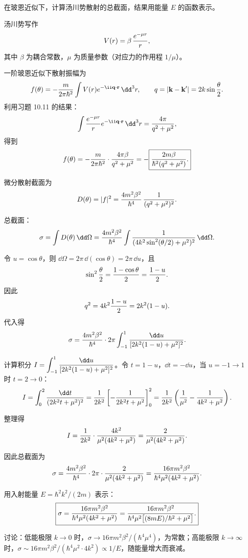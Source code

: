 \begin{question}
在玻恩近似下，计算汤川势散射的总截面，结果用能量 $E$ 的函数表示。
\end{question}
\begin{solution}
汤川势写作
\[
V(r)=\beta\,{e^{-\mu r}\over r},
\]
其中 $\beta$ 为耦合常数，$\mu$ 为质量参数（对应力的作用程 $1/\mu$）。

一阶玻恩近似下散射振幅为
\[
f(\theta)=-{m\over2\pi\hbar^2}\int V(r)e^{-\ii\mathbf q\cdot\mathbf r}\,\dd^3r,
\qquad q=|\mathbf k-\mathbf k'|=2k\sin{\theta\over2}.
\]
利用习题 10.11 的结果：
\[
\int {e^{-\mu r}\over r}e^{-\ii\mathbf q\cdot\mathbf r}\,\dd^3r={4\pi\over q^2+\mu^2},
\]
得到
\[
f(\theta)=-{m\over2\pi\hbar^2}\cdot{4\pi\beta\over q^2+\mu^2}
=-\boxed{{2m\beta\over\hbar^2(q^2+\mu^2)}.}
\]

微分散射截面为
\[
D(\theta)=|f|^2={4m^2\beta^2\over\hbar^4}\,{1\over(q^2+\mu^2)^2}.
\]

总截面：
\[
\sigma=\int D(\theta)\,\dd\Omega
={4m^2\beta^2\over\hbar^4}\int{1\over(4k^2\sin^2(\theta/2)+\mu^2)^2}\,\dd\Omega.
\]

令 $u=\cos\theta$，则 $\dd\Omega=2\pi\,\dd(\cos\theta)=2\pi\,\dd u$，且
\[
\sin^2{\theta\over2}={1-\cos\theta\over2}={1-u\over2}.
\]
因此
\[
q^2=4k^2{1-u\over2}=2k^2(1-u).
\]
代入得
\[
\sigma={4m^2\beta^2\over\hbar^4}\cdot2\pi\int_{-1}^{1}{\dd u\over[2k^2(1-u)+\mu^2]^2}.
\]

计算积分 $\displaystyle I=\int_{-1}^{1}{\dd u\over[2k^2(1-u)+\mu^2]^2}$。令 $t=1-u$，$\dd t=-\dd u$，当 $u=-1\to1$ 时 $t=2\to0$：
\[
I=\int_{0}^{2}{\dd t\over(2k^2t+\mu^2)^2}
={1\over2k^2}\left[-{1\over2k^2t+\mu^2}\right]_{0}^{2}
={1\over2k^2}\left({1\over\mu^2}-{1\over4k^2+\mu^2}\right).
\]

整理得
\[
I={1\over2k^2}\cdot{4k^2\over\mu^2(4k^2+\mu^2)}
={2\over\mu^2(4k^2+\mu^2)}.
\]

因此总截面为
\[
\sigma={4m^2\beta^2\over\hbar^4}\cdot2\pi\cdot{2\over\mu^2(4k^2+\mu^2)}
={16\pi m^2\beta^2\over\hbar^4\mu^2(4k^2+\mu^2)}.
\]

用入射能量 $E=\hbar^2k^2/(2m)$ 表示：
\[
\boxed{\sigma={16\pi m^2\beta^2\over\hbar^4\mu^2(4k^2+\mu^2)}
={16\pi m^2\beta^2\over\hbar^4\mu^2\bigl[(8mE)/\hbar^2+\mu^2\bigr]}.}
\]

讨论：低能极限 $k\to0$ 时，$\sigma\to 16\pi m^2\beta^2/(\hbar^4\mu^4)$，为常数；高能极限 $k\to\infty$ 时，$\sigma\sim16\pi m^2\beta^2/(\hbar^4\mu^2\cdot4k^2)\propto 1/E$，随能量增大而衰减。
\end{solution}

